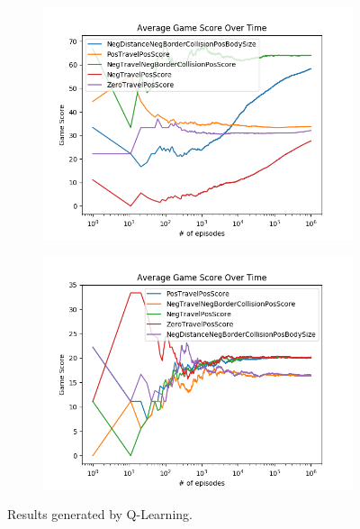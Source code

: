 \documentclass[result.tex]{subfiles}
\begin{document}
    \begin{figure}[ht]
        \centering
        \begin{subfigure}[b]{0.8\linewidth}
            \includegraphics[width=\linewidth]{../images/qlearning/reward/42/reward_qlearning_board_state_average_game_score_over_time.png}
        \end{subfigure}

        \begin{subfigure}[b]{0.8\linewidth}
            \includegraphics[width=\linewidth]{../images/qlearning/reward/42/reward_qlearning_directional_state_average_game_score_over_time.png}
        \end{subfigure}
        \caption{Results generated by Q-Learning.}
        \label{fig:reward_result_qlearning}
    \end{figure}
\end{document}
